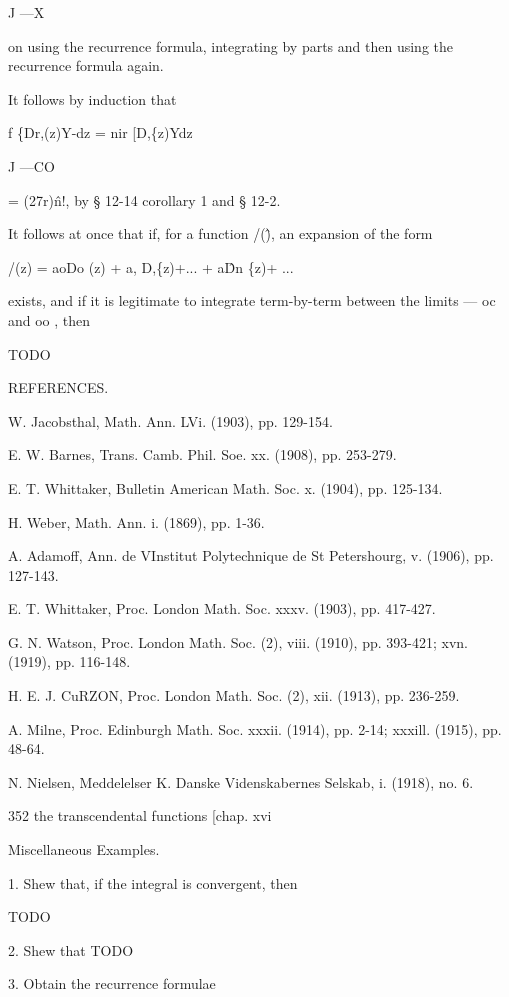 J —X 

on using the recurrence formula, integrating by parts and then using the 
recurrence formula again. 

It follows by induction that 

f \{Dr,(z)Y-dz = nir [D,\{z)Ydz 

J —CO 

= (27r)\^n!, 
by § 12-14 corollary 1 and § 12-2. 

It follows at once that if, for a function /(\^), an expansion of the form 

/(z) = aoDo (z) + a, D,\{z)+... + a\^Dn \{z)+ ... 

exists, and if it is legitimate to integrate term-by-term between the limits 
— oc and oo , then 



TODO



REFERENCES. 

W. Jacobsthal, Math. Ann. LVi. (1903), pp. 129-154. 

E. W. Barnes, Trans. Camb. Phil. Soe. xx. (1908), pp. 253-279. 

E. T. Whittaker, Bulletin American Math. Soc. x. (1904), pp. 125-134. 

H. Weber, Math. Ann. i. (1869), pp. 1-36. 

A. Adamoff, Ann. de VInstitut Polytechnique de St Petershourg, v. (1906), pp. 127-143. 

E. T. Whittaker, Proc. London Math. Soc. xxxv. (1903), pp. 417-427. 

G. N. Watson, Proc. London Math. Soc. (2), viii. (1910), pp. 393-421; xvn. (1919), 
pp. 116-148. 

H. E. J. CuRZON, Proc. London Math. Soc. (2), xii. (1913), pp. 236-259. 

A. Milne, Proc. Edinburgh Math. Soc. xxxii. (1914), pp. 2-14; xxxill. (1915), pp. 48-64. 

N. Nielsen, Meddelelser K. Danske Videnskabernes Selskab, i. (1918), no. 6. 



352 the transcendental functions [chap. xvi 

Miscellaneous Examples. 

1. Shew that, if the integral is convergent, then 

TODO

2. Shew that TODO

3. Obtain the recurrence formulae 

